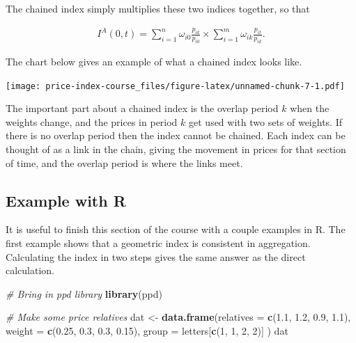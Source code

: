 \documentclass[]{article}
\newenvironment{Shaded}{\begin{snugshade}}{\end{snugshade}}
\newcommand{\CommentTok}[1]{\textcolor[rgb]{0.56,0.35,0.01}{\textit{#1}}}
\newcommand{\DataTypeTok}[1]{\textcolor[rgb]{0.13,0.29,0.53}{#1}}
\newcommand{\DecValTok}[1]{\textcolor[rgb]{0.00,0.00,0.81}{#1}}
\newcommand{\FloatTok}[1]{\textcolor[rgb]{0.00,0.00,0.81}{#1}}
\newcommand{\KeywordTok}[1]{\textcolor[rgb]{0.13,0.29,0.53}{\textbf{#1}}}
\newcommand{\NormalTok}[1]{#1}
\newcommand{\StringTok}[1]{\textcolor[rgb]{0.31,0.60,0.02}{#1}}
\begin{document}
The chained index simply multiplies these two indices together, so that

\begin{align*}
I^{A}(0, t) = \sum_{i = 1}^{n} \omega_{i0} \frac{p_{ik}}{p_{i0}} \times \sum_{i = 1}^{m} \omega_{ik} \frac{p_{it}}{p_{ik}}.
\end{align*}

The chart below gives an example of what a chained index looks like.

\texttt{[image: price-index-course\_files/figure-latex/unnamed-chunk-7-1.pdf]}

The important part about a chained index is the overlap period \(k\) when the weights change, and the prices in period \(k\) get used with two sets of weights. If there is no overlap period then the index cannot be chained. Each index can be thought of as a link in the chain, giving the movement in prices for that section of time, and the overlap period is where the links meet.

\hypertarget{example-with-r-1}{%
\subsection{Example with R}\label{example-with-r-1}}

It is useful to finish this section of the course with a couple examples in R. The first example shows that a geometric index is consistent in aggregation. Calculating the index in two steps gives the same answer as the direct calculation.

\begin{Shaded}
\begin{Highlighting}[]
\CommentTok{# Bring in ppd library}
\KeywordTok{library}\NormalTok{(ppd)}

\CommentTok{# Make some price relatives}
\NormalTok{dat <-}\StringTok{ }\KeywordTok{data.frame}\NormalTok{(}\DataTypeTok{relatives =} \KeywordTok{c}\NormalTok{(}\FloatTok{1.1}\NormalTok{, }\FloatTok{1.2}\NormalTok{, }\FloatTok{0.9}\NormalTok{, }\FloatTok{1.1}\NormalTok{),}
                  \DataTypeTok{weight =} \KeywordTok{c}\NormalTok{(}\FloatTok{0.25}\NormalTok{, }\FloatTok{0.3}\NormalTok{, }\FloatTok{0.3}\NormalTok{, }\FloatTok{0.15}\NormalTok{),}
                  \DataTypeTok{group =}\NormalTok{ letters[}\KeywordTok{c}\NormalTok{(}\DecValTok{1}\NormalTok{, }\DecValTok{1}\NormalTok{, }\DecValTok{2}\NormalTok{, }\DecValTok{2}\NormalTok{)]}
\NormalTok{)}
\NormalTok{dat}
\end{Highlighting}
\end{Shaded}
\end{document}
